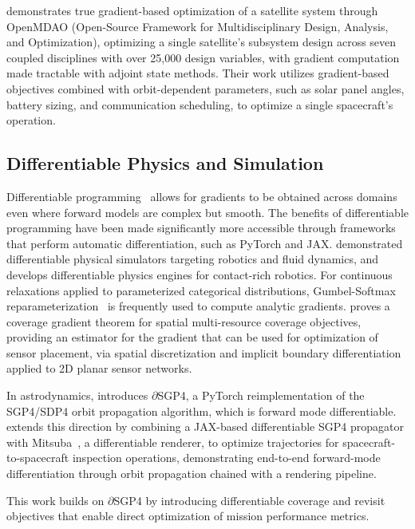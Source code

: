 \citet{hwang_large-scale_2014} demonstrates true gradient-based optimization of a satellite system through OpenMDAO (Open-Source Framework for Multidisciplinary Design, Analysis, and Optimization), optimizing a single satellite's subsystem design across seven coupled disciplines with over 25{,}000 design variables, with gradient computation made tractable with adjoint state methods. Their work utilizes gradient-based objectives combined with orbit-dependent parameters,  such as solar panel angles, battery sizing, and communication scheduling, to optimize a single spacecraft's operation. 


\subsection{Differentiable Physics and Simulation}

Differentiable programming~\citep{baydin_automatic_2018} allows for gradients to be obtained across domains even where forward models are complex but smooth. 
The benefits of differentiable programming have been made significantly more accessible through frameworks that perform automatic differentiation, such as PyTorch and JAX.
\citet{hu_difftaichi_2020} demonstrated differentiable physical simulators targeting robotics and fluid dynamics, and \citet{degrave_differentiable_2019} develops differentiable physics engines for contact-rich robotics.
For continuous relaxations applied to parameterized categorical distributions, Gumbel-Softmax reparameterization~\citep{jang_categorical_2017} is frequently used to compute analytic gradients.
\citet{kamra_gradient-based_2021} proves a coverage gradient theorem for spatial multi-resource coverage objectives, providing an estimator for the gradient that can be used for optimization of sensor placement, via spatial discretization and implicit boundary differentiation applied to 2D planar sensor networks.

In astrodynamics, \citet{acciarini_closing_2025} introduces $\partial$SGP4, a PyTorch reimplementation of the SGP4/SDP4 orbit propagation algorithm, which is forward mode differentiable.
\citet{naylor_dlite_2025} extends this direction by combining a JAX-based differentiable SGP4 propagator with Mitsuba~\citep{noauthor_mitsuba_nodate}, a differentiable renderer, to optimize trajectories for spacecraft-to-spacecraft inspection operations, demonstrating end-to-end forward-mode differentiation through orbit propagation chained with a rendering pipeline.

This work builds on $\partial$SGP4 by introducing differentiable coverage and revisit objectives that enable direct optimization of mission performance metrics.
